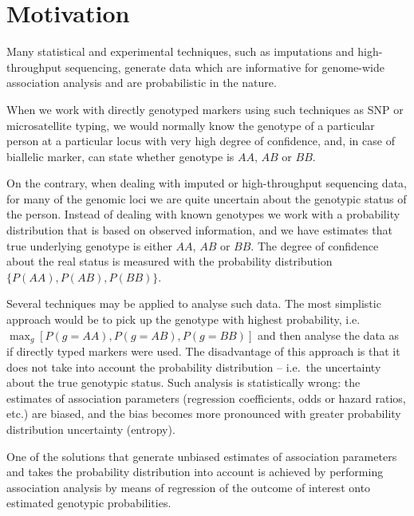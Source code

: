 \documentclass[12pt,a4paper]{article}
\begin{document}
\maketitle
\tableofcontents


\section{Motivation}

Many statistical and experimental techniques, such as imputations and
high-throughput sequencing, generate data which are informative for
genome-wide association analysis and are probabilistic in the nature.

When we work with directly genotyped markers using such techniques as
SNP or microsatellite typing, we would normally know the genotype of
a particular person at a particular locus with very high degree of
confidence, and, in case of biallelic marker, can state whether
genotype is $AA$, $AB$ or $BB$.

On the contrary, when dealing with imputed or
high-throughput sequencing data, for many of the genomic loci
we are quite uncertain about the genotypic status of the person.
Instead of dealing with known genotypes we work with a probability
distribution that is based on observed information, and we have estimates that true underlying
genotype is either $AA$, $AB$ or $BB$. The degree of confidence
about the real status is measured with the
probability distribution $\{P(AA), P(AB), P(BB)\}$.

Several techniques may be applied to analyse such data. The most
simplistic approach would be to pick up the genotype with highest
probability, i.e.~$\max_g[P(g=AA), P(g=AB), P(g=BB)]$ and then
analyse the data as if directly typed markers were used. The
disadvantage of this approach is that it does not take into
account the probability distribution -- i.e.~the uncertainty
about the true genotypic status. Such
analysis is statistically wrong: the estimates of association
parameters (regression coefficients, odds or hazard ratios, etc.)
are biased, and the bias becomes more pronounced with greater
probability distribution uncertainty (entropy).

One of the solutions that generate unbiased estimates
of association parameters and takes the
probability distribution into account is achieved by
performing association analysis by means of regression of the
outcome of interest onto estimated genotypic probabilities.
\end{document}
